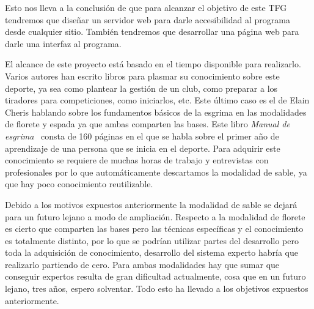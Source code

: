 \documentclass[11pt,a4paper,twoside,final]{article}
\begin{document}
Esto nos lleva a la conclusión de que para alcanzar el objetivo de este TFG tendremos que diseñar un servidor web
 para darle accesibilidad al programa desde cualquier sitio. También tendremos que desarrollar una página web
 para darle una interfaz al programa.

\bigskip
El alcance de este proyecto está basado en el tiempo disponible para realizarlo. Varios autores han escrito
 libros para plasmar su conocimiento sobre este deporte, ya sea como plantear la gestión de un club, como
 preparar a los tiradores para competiciones, como iniciarlos, etc. Este último caso es el de Elain Cheris
 hablando sobre los fundamentos básicos de la esgrima en las modalidades de florete y espada ya que ambas
 comparten las bases. Este libro \textit{Manual de esgrima}~\cite{manualdeesgrima} consta de 160 páginas
 en el que se habla sobre el primer año de aprendizaje de una persona que se inicia en el deporte. Para
 adquirir este conocimiento se requiere de muchas horas de trabajo y entrevistas con profesionales por
 lo que automáticamente descartamos la modalidad de sable, ya que hay poco conocimiento reutilizable.

\bigskip
Debido a los motivos expuestos anteriormente la modalidad de sable se dejará para un futuro lejano a modo
 de ampliación. Respecto a la modalidad de florete es cierto que comparten las bases pero las técnicas
 específicas y el conocimiento es totalmente distinto, por lo que se podrían utilizar partes del desarrollo
 pero toda la adquisición de conocimiento, desarrollo del sistema experto habría que realizarlo partiendo
 de cero. Para ambas modalidades hay que sumar que conseguir expertos resulta de gran dificultad actualmente,
 cosa que en un futuro lejano, tres años, espero solventar. Todo esto ha llevado a los objetivos expuestos anteriormente.




\iffalse



\end{document}
